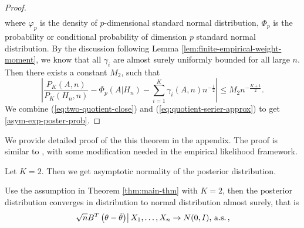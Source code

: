 \begin{thm}
\begin{proof}
\begin{eqnarray*}
\end{eqnarray*}
where $\varphi_{p}$ is the density of  $p$-dimensional standard normal
distribution, $\Phi_{p}$ is the probability or conditional probability
of dimension $p$ standard normal distribution. By the discussion
following Lemma \ref{lem:finite-empirical-weight-moment}, we know that
all $\gamma_{i}$ are almost surely uniformly bounded for all large
$n$. Then there exists a constant $M_{2}$, such that 
\begin{equation}
\left|\frac{P_{K}\left(A,n\right)}{P_{K}\left(H_{n},n\right)}-\Phi_{p}\left(A|H_{n}\right)-\sum_{i=1}^{K}\gamma_{i}\left(A,n\right)n^{-\frac{i}{2}}\right|\le M_{2}n^{-\frac{K+1}{2}}.\label{eq:quotient-serier-approx}
\end{equation}
We combine (\ref{eq:two-quotient-close}) and (\ref{eq:quotient-serier-approx})
to get \eqref{asym-exp-poster-prob}.
\end{proof}
\end{thm}
We provide detailed proof of the this theorem in the appendix. The proof
is similar to \citet{johnson1970asymptotic}, with some modification
needed in the empirical likelihood framework. 

Let $K=2$. Then we get asymptotic normality of the posterior distribution. 
\begin{cor}
Use the assumption in Theorem \ref{thm:main-thm} with $K=2$, then
the posterior distribution converges in distribution to normal distribution
almost surely, that is 
\[
\left.\sqrt{n}B^T\left(\theta-\tilde{\theta}\right)\right|X_{1},\ldots,X_{n}\rightarrow N(0,I),\,\mathrm{a.s.}\,,
\]
\end{cor}


